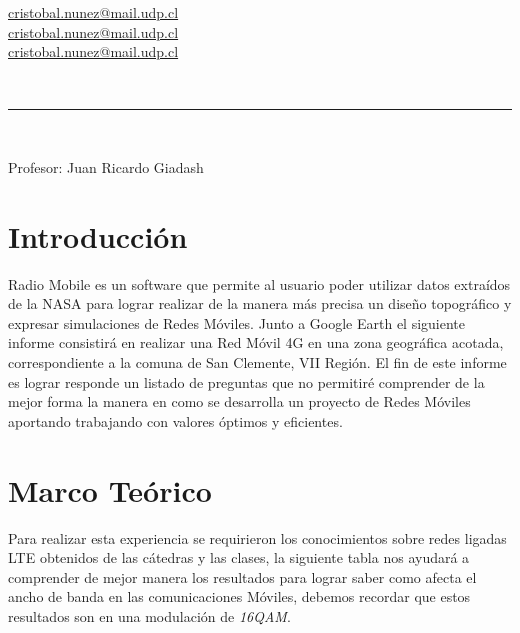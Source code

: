 \documentclass[Article, letterpaper,12pt]{article}
\begin{document}
\begin{titlepage}
\begin{center}
\begin{large}
\begin{small}
{\color{blue}
\href{mailto:cristobal.nunez@mail.udp.cl}{cristobal.nunez@mail.udp.cl}\\
\href{mailto:cristobal.nunez@mail.udp.cl}{cristobal.nunez@mail.udp.cl}\\
\href{mailto:cristobal.nunez@mail.udp.cl}{cristobal.nunez@mail.udp.cl}\\
}




\end{small}\\ 
\end{large}
\vspace*{0.4mm}
\rule{90mm}{0.1mm}\\
\vspace*{0.2in}
    \begin{large}
        Profesor: Juan Ricardo Giadash\\
    \end{large}
\end{center}


\newpage 
\tableofcontents

\newpage
\end{titlepage}

\section{Introducción}
Radio Mobile es un software que permite al usuario poder utilizar datos extraídos de la NASA para lograr realizar de la manera más precisa un diseño topográfico y expresar simulaciones de Redes Móviles. Junto a Google Earth el siguiente informe consistirá en realizar una Red Móvil 4G en una zona geográfica acotada, correspondiente a la comuna de San Clemente, VII Región.
El fin de este informe es lograr responde un listado de preguntas que no permitiré comprender de la mejor forma la manera en como se desarrolla un proyecto de Redes Móviles aportando trabajando con valores óptimos y eficientes.

\section{Marco Teórico}
Para realizar esta experiencia se requirieron los conocimientos sobre redes ligadas LTE obtenidos de las cátedras y las clases, la siguiente tabla nos ayudará a comprender de mejor manera los resultados para lograr saber como afecta el ancho de banda en las comunicaciones Móviles, debemos recordar que estos resultados son en una modulación de \textit{16QAM}.
\end{document}
